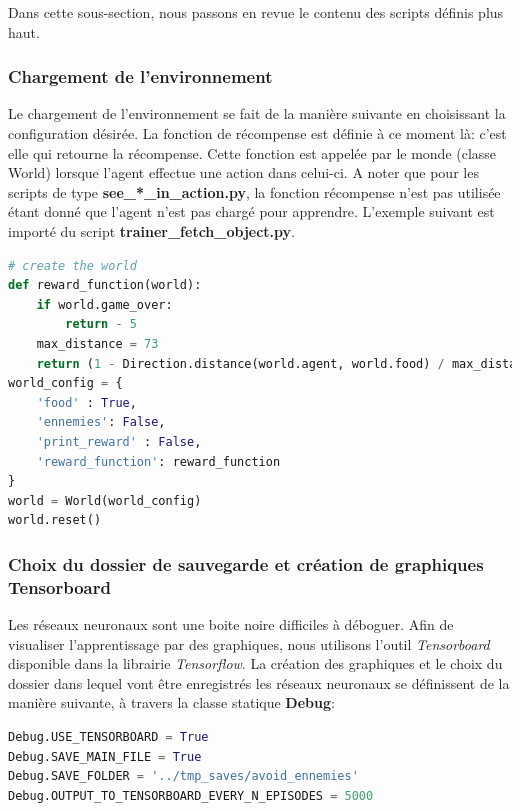 \documentclass[11pt,a4paper]{report}
\begin{document}
  \par Dans cette sous-section, nous passons en revue le contenu des scripts définis plus haut. 
  
  \subsubsection{Chargement de l'environnement}
  
  \par Le chargement de l'environnement se fait de la manière suivante en choisissant la configuration désirée. La fonction de récompense est définie à ce moment là: c'est elle qui retourne la récompense. Cette fonction est appelée par le monde (classe World) lorsque l'agent effectue une action dans celui-ci. A noter que pour les scripts de type \textbf{see\_*\_in\_action.py}, la fonction récompense n'est pas utilisée étant donné que l'agent n'est pas chargé pour apprendre. L'exemple suivant est importé du script \textbf{trainer\_fetch\_object.py}.
  
  \begin{lstlisting}[language=python]
# create the world
def reward_function(world):
    if world.game_over:
        return - 5
    max_distance = 73
    return (1 - Direction.distance(world.agent, world.food) / max_distance)
world_config = {
    'food' : True,
    'ennemies': False,
    'print_reward' : False,
    'reward_function': reward_function
}
world = World(world_config)
world.reset()
  \end{lstlisting}   
  
  \subsubsection{Choix du dossier de sauvegarde et création de graphiques Tensorboard}
  
  \par Les réseaux neuronaux sont une boite noire difficiles à déboguer. Afin de visualiser l'apprentissage par des graphiques, nous utilisons l'outil \textit{Tensorboard} disponible dans la librairie \textit{Tensorflow}. La création des graphiques et le choix du dossier dans lequel vont être enregistrés les réseaux neuronaux se définissent de la manière suivante, à travers la classe statique \textbf{Debug}: 
  
  \begin{lstlisting}[language=python]
Debug.USE_TENSORBOARD = True
Debug.SAVE_MAIN_FILE = True
Debug.SAVE_FOLDER = '../tmp_saves/avoid_ennemies'
Debug.OUTPUT_TO_TENSORBOARD_EVERY_N_EPISODES = 5000
  \end{lstlisting}   
  
\end{document}
